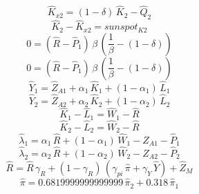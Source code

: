 \begin{dmath}
{{\hat{K}_{x2}}}=\left(1-{{\delta}}\right)\, {{\hat{K}_{2}}}-{{\hat{Q}_{2}}}
\end{dmath}
\begin{dmath}
{{\hat{K}_{2}}}-{{\hat{K}_{x2}}}={{sunspot_{K2}}}
\end{dmath}
\begin{dmath}
0=\left({{\hat{R}}}-{{\hat{P}_{1}}}\right)\, {{\beta}}\, \left(\frac{1}{{{\beta}}}-\left(1-{{\delta}}\right)\right)
\end{dmath}
\begin{dmath}
0=\left({{\hat{R}}}-{{\hat{P}_{1}}}\right)\, {{\beta}}\, \left(\frac{1}{{{\beta}}}-\left(1-{{\delta}}\right)\right)
\end{dmath}
\begin{dmath}
{{\hat{Y}_{1}}}={{\hat{Z}_{A1}}}+{{\alpha_{1}}}\, {{\hat{K}_{1}}}+\left(1-{{\alpha_{1}}}\right)\, {{\hat{L}_{1}}}
\end{dmath}
\begin{dmath}
{{\hat{Y}_{2}}}={{\hat{Z}_{A2}}}+{{\alpha_{2}}}\, {{\hat{K}_{2}}}+\left(1-{{\alpha_{2}}}\right)\, {{\hat{L}_{2}}}
\end{dmath}
\begin{dmath}
{{\hat{K}_{1}}}-{{\hat{L}_{1}}}={{\hat{W}_{1}}}-{{\hat{R}}}
\end{dmath}
\begin{dmath}
{{\hat{K}_{2}}}-{{\hat{L}_{2}}}={{\hat{W}_{2}}}-{{\hat{R}}}
\end{dmath}
\begin{dmath}
{{\hat{\lambda}_{1}}}={{\alpha_{1}}}\, {{\hat{R}}}+\left(1-{{\alpha_{1}}}\right)\, {{\hat{W}_{1}}}-{{\hat{Z}_{A1}}}-{{\hat{P}_{1}}}
\end{dmath}
\begin{dmath}
{{\hat{\lambda}_{2}}}={{\alpha_{2}}}\, {{\hat{R}}}+\left(1-{{\alpha_{2}}}\right)\, {{\hat{W}_{2}}}-{{\hat{Z}_{A2}}}-{{\hat{P}_{2}}}
\end{dmath}
\begin{dmath}
{{\hat{R}}}={{\hat{R}}}\, {{\gamma_{R}}}+\left(1-{{\gamma_{R}}}\right)\, \left({{\gamma_{pi}}}\, {{\hat{\pi}}}+{{\gamma_{Y}}}\, {{\hat{Y}}}\right)+{{\hat{Z}_M}}
\end{dmath}
\begin{dmath}
{{\hat{\pi}}}=0.6819999999999999\, {{\hat{\pi}_{2}}}+0.318\, {{\hat{\pi}_{1}}}
\end{dmath}
